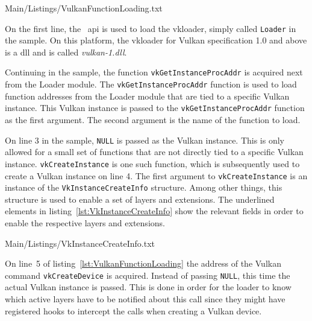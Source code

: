       
      {Main/Listings/VulkanFunctionLoading.txt}

      On the first line, the ~\gls{api} is used to load the \gls{vkloader}, simply called \lstinline{Loader} in the sample.
      On this platform, the \gls{vkloader} for Vulkan specification 1.0 and above is a \gls{dll} and is called \textit{vulkan-1.dll}.

      Continuing in the sample, the function \lstinline{vkGetInstanceProcAddr} is acquired next from the Loader module.
      The \lstinline{vkGetInstanceProcAddr} function is used to load function addresses from the Loader module that are tied to a specific Vulkan instance.
      This Vulkan instance is passed to the \lstinline{vkGetInstanceProcAddr} function as the first argument.
      The second argument is the name of the function to load.

      On line 3 in the sample, \lstinline{NULL} is passed as the Vulkan instance.
      This is only allowed for a small set of functions that are not directly tied to a specific Vulkan instance.
      \lstinline{vkCreateInstance} is one such function, which is subsequently used to create a Vulkan instance on line 4.
      The first argument to \lstinline{vkCreateInstance} is an instance of the \lstinline{VkInstanceCreateInfo} structure.
      Among other things, this structure is used to enable a set of layers and extensions.
      The underlined elements in listing~\ref{lst:VkInstanceCreateInfo} show the relevant fields in order to enable the respective layers and extensions.

      
      {Main/Listings/VkInstanceCreateInfo.txt}

      On line~5 of listing~\ref{lst:VulkanFunctionLoading} the address of the Vulkan command \lstinline{vkCreateDevice} is acquired.
      Instead of passing \lstinline{NULL}, this time the actual Vulkan instance is passed.
      This is done in order for the loader to know which active layers have to be notified about this call since they might have registered hooks to intercept the calls when creating a Vulkan device.

